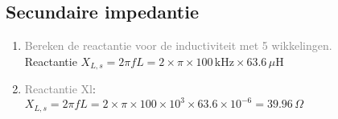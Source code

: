 \subsection{Secundaire impedantie}
\begin{enumerate}
    \item \textcolor{gray}{Bereken de reactantie voor de inductiviteit met 5 wikkelingen.}
    \\ Reactantie \( X_{L,s} = 2 \pi f L = 2 \times \pi \times 100 \, \text{kHz} \times 63.6 \, \mu \text{H} \)
    
    \item \textcolor{gray}{Reactantie Xl}:
    \\ \(X_{L,s} = 2 \pi f L = 2 \times \pi \times 100 \times 10^3 \times 63.6 \times 10^{-6} = 39.96 \, \Omega\)
\end{enumerate}

